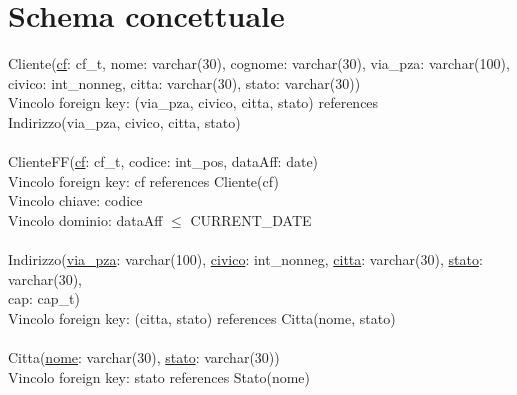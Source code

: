 \documentclass[a4paper,12pt]{report}
\begin{document}
    \chapter{Schema concettuale}
      Cliente(\underline{cf}: cf\_t, nome: varchar(30), cognome: varchar(30), via\_pza: varchar(100), \\
      \hspace*{2cm}civico: int\_nonneg, citta: varchar(30), stato: varchar(30)) \\
      \hspace*{1cm} Vincolo foreign key: (via\_pza, civico, citta, stato) references \\
      \hspace*{2cm}Indirizzo(via\_pza, civico, citta, stato) \\ \\

      \hspace*{-0.75cm}
      ClienteFF(\underline{cf}: cf\_t, codice: int\_pos, dataAff: date) \\
      \hspace*{1cm} Vincolo foreign key: cf references Cliente(cf) \\
      \hspace*{1cm} Vincolo chiave: codice \\
      \hspace*{1cm} Vincolo dominio: dataAff $\leq$ CURRENT\_DATE \\ \\

      \hspace*{-0.75cm}
      Indirizzo(\underline{via\_pza}: varchar(100), \underline{civico}: int\_nonneg, \underline{citta}: varchar(30), \underline{stato}: varchar(30), \\
      \hspace*{2cm}cap: cap\_t) \\
      \hspace*{1cm} Vincolo foreign key: (citta, stato) references Citta(nome, stato) \\ \\

      \hspace*{-0.75cm}
      Citta(\underline{nome}: varchar(30), \underline{stato}: varchar(30)) \\
      \hspace*{1cm} Vincolo foreign key: stato references Stato(nome) \\ \\
\end{document}
